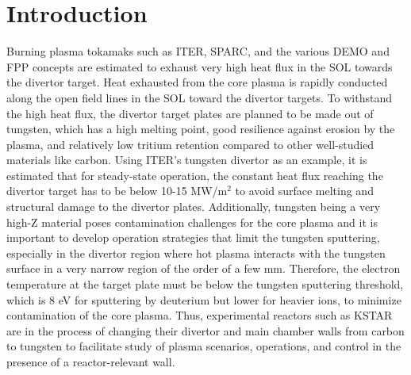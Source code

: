 \section{Introduction}
\label{sec:introduction}

Burning plasma tokamaks such as ITER\cite{Holtkamp_2007_FED}, SPARC\cite{Creely_2020_JPP}, and the various DEMO\cite{Federici_2014_FED} and \ac{FPP}\cite{Buttery_2021_NF} concepts are estimated to exhaust very high heat flux in the \ac{SOL} towards the divertor target.
Heat exhausted from the core plasma is rapidly conducted along the open field lines in the \ac{SOL} toward the divertor targets.
To withstand the high heat flux, the divertor target plates are planned to be made out of tungsten, which has a high melting point, good resilience against erosion by the plasma, and relatively low tritium retention compared to other well-studied materials like carbon.
Using ITER's tungsten divertor as an example, it is estimated that for steady-state operation, the constant heat flux reaching the divertor target has to be below 10-15 MW/m$^2$\cite{Pitts_2019_NME} to avoid surface melting and structural damage to the divertor plates.
Additionally, tungsten being a very high-Z material poses contamination challenges for the core plasma and it is important to develop operation strategies that limit the tungsten sputtering, especially in the divertor region where hot plasma interacts with the tungsten surface in a very narrow region of the order of a few mm\cite{Eich_2013_NF}.
Therefore, the electron temperature at the target plate must be below the tungsten sputtering threshold, which is 8 eV\cite{Brezinsek_2019_NF} for sputtering by deuterium but lower for heavier ions, to minimize contamination of the core plasma.
Thus, experimental reactors such as KSTAR are in the process of changing their divertor and main chamber walls from carbon to tungsten to facilitate study of plasma scenarios, operations, and control in the presence of a reactor-relevant wall.

